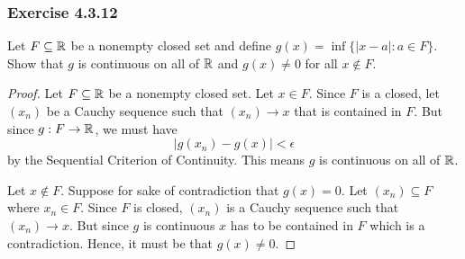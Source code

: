 \subsubsection{Exercise 4.3.12} Let \( F \subseteq \mathbb{R}  \) be a nonempty closed set and define \( g(x) = \inf \{ | x - a  | : a \in  F  \}  \). Show that \( g \) is continuous on all of \( \mathbb{R}  \) and \( g(x) \neq  0 \) for all \( x \notin F  \).
\begin{proof}
Let \( F \subseteq \mathbb{R}  \) be a nonempty closed set. Let \( x \in F  \). Since \( F \) is a closed, let \( (x_n)  \) be a Cauchy sequence such that \( (x_n) \to x  \) that is contained in \( F \). But since \( g: F \to \mathbb{R}  \), we must have 
\[ | g(x_n) - g(x) | < \epsilon \]
by the Sequential Criterion of Continuity. This means \( g \) is continuous on all of \( \mathbb{R}  \).

Let \( x \notin F  \). Suppose for sake of contradiction that \( g(x) = 0  \). Let \( (x_n) \subseteq F  \) where \( x_n \in F  \). Since \( F  \) is closed, \( (x_n) \) is a Cauchy sequence such that \( (x_n) \to x  \). But since \( g \) is continuous \( x  \) has to be contained in \( F  \) which is a contradiction. Hence, it must be that \( g(x) \neq 0  \).
\end{proof}









